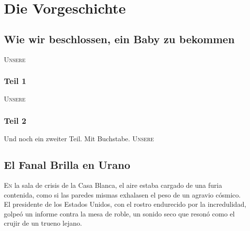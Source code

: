 \part*{Die Vorgeschichte}


\chapter*{Wie wir beschlossen, ein Baby zu bekommen}

\lettrine[lines=2, loversize=0.3, lraise=0]{\initfamily U}{nsere}

\section*{Teil 1}
\lettrine[lines=2, loversize=0.3, lraise=0]{\initfamily U}{nsere}
\section*{Teil 2}

Und noch ein zweiter Teil. Mit Buchstabe. \lettrine[lines=2, loversize=0.3, lraise=0]{\initfamily U}{nsere}

\chapter{El Fanal Brilla en Urano}

\lettrine[lines=2, loversize=0.3, lraise=0]{E}{n} la sala de crisis de la Casa Blanca, el aire estaba cargado de una furia contenida, como si las paredes mismas exhalasen el peso de un agravio cósmico. El presidente de los Estados Unidos, con el rostro endurecido por la incredulidad, golpeó un informe contra la mesa de roble, un sonido seco que resonó como el crujir de un trueno lejano.

